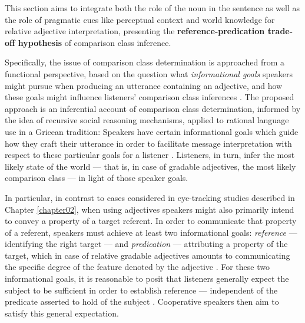 This section aims to integrate both the role of the noun in the sentence as well as the role of pragmatic cues like perceptual context and world knowledge for relative adjective interpretation, presenting the \textbf{reference-predication trade-off hypothesis} of comparison class inference. 

Specifically, the issue of comparison class determination is approached from a functional perspective, based on the question what \emph{informational goals} speakers might pursue when producing an utterance containing an adjective, and how these goals might influence listeners’ comparison class inferences \parencite{tessler2020}.
The proposed approach is an inferential account of comparison class determination, informed by the idea of recursive social reasoning mechanisms, applied to rational language use in a Gricean tradition: Speakers have certain informational goals which guide how they craft their utterance in order to facilitate message interpretation with respect to these particular goals for a listener \parencite{goodman2016}. Listeners, in turn, infer the most likely state of the world --- that is, in case of gradable adjectives, the most likely comparison class --- in light of those speaker goals. 

In particular, in contrast to cases considered in eye-tracking studies described in Chapter \ref{chapter02},  when using adjectives speakers might also primarily intend to convey a property of a target referent. In order to communicate that property of a referent, speakers must achieve at least two informational goals: \textit{reference} --- identifying the right target --- and \textit{predication} --- attributing a property of the target, which in case of relative gradable adjectives amounts to communicating the specific degree of the feature denoted by the adjective \parencite{Reboul2001, Kennedy2007}.  
For these two informational goals, it is reasonable to posit that listeners generally expect the subject to be sufficient in order to establish reference --- independent of the predicate asserted to hold of the subject \parencite{Reboul2001, syrett2010meaning, searle1969speech}. Cooperative speakers then aim to satisfy this general expectation.

